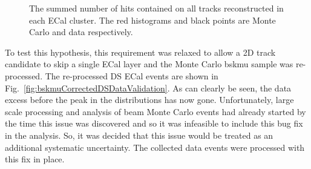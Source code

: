 \begin{figure}%
  \centering
  \caption{The summed number of hits contained on all tracks reconstructed in each ECal cluster.  The red histograms and black points are Monte Carlo and data respectively.}
  \label{fig:TotalHitsDataValidation}
\end{figure}
\newline
\newline
To test this hypothesis, this requirement was relaxed to allow a 2D track candidate to skip a single ECal layer and the Monte Carlo bskmu sample was re-processed.  The re-processed DS ECal events are shown in Fig.~\ref{fig:bskmuCorrectedDSDataValidation}.  As can clearly be seen, the data excess before the peak in the distributions has now gone.  Unfortunately, large scale processing and analysis of beam Monte Carlo events had already started by the time this issue was discovered and so it was infeasible to include this bug fix in the analysis.  So, it was decided that this issue would be treated as an additional systematic uncertainty.  The collected data events were processed with this fix in place.
